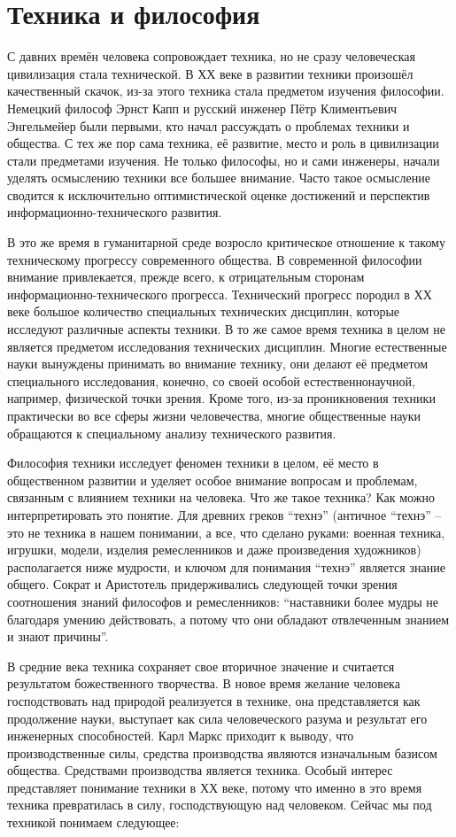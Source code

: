 \section{Техника и философия}
С давних времён человека сопровождает техника, но не сразу человеческая цивилизация стала технической. В ХХ веке в развитии техники произошёл качественный скачок, из-за этого техника стала предметом изучения философии. Немецкий философ Эрнст Капп и русский инженер Пётр Климентьевич Энгельмейер были первыми, кто начал рассуждать о проблемах техники и общества. С тех же пор сама техника, её развитие, место и роль в цивилизации стали предметами изучения. Не только философы, но и сами инженеры, начали уделять осмыслению техники все большее внимание. Часто такое осмысление сводится к исключительно оптимистической оценке достижений и перспектив информационно-технического развития. 

В это же время в гуманитарной среде возросло критическое отношение к такому техническому прогрессу современного общества. В современной философии внимание привлекается, прежде всего, к отрицательным сторонам информационно-технического прогресса.  Технический прогресс породил в ХХ веке большое количество специальных технических дисциплин, которые исследуют различные аспекты техники. В то же самое время техника в целом не является предметом исследования технических дисциплин. Многие естественные науки вынуждены принимать во внимание технику, они делают её предметом специального исследования, конечно, со своей особой естественнонаучной, например, физической точки зрения. Кроме того, из-за проникновения техники практически во все сферы жизни человечества, многие общественные науки обращаются к специальному анализу технического развития. 

Философия техники исследует феномен техники в целом, её место в общественном развитии и уделяет особое внимание вопросам и проблемам, связанным с влиянием техники на человека.  Что же такое техника? Как можно интерпретировать это понятие. Для древних греков ``технэ'' (античное ``технэ'' – это не техника в нашем понимании, а все, что сделано руками: военная техника, игрушки, модели, изделия ремесленников и даже произведения художников) располагается ниже мудрости, и ключом для понимания ``технэ'' является знание общего. Сократ и Аристотель придерживались следующей точки зрения соотношения знаний философов и ремесленников: ``наставники более мудры не благодаря умению действовать, а потому что они обладают отвлеченным знанием и знают причины''.

В средние века техника сохраняет свое вторичное значение и считается результатом божественного творчества. В новое время желание человека господствовать над природой реализуется в технике, она представляется как продолжение науки, выступает как сила человеческого разума и результат его инженерных способностей. Карл Маркс приходит к выводу, что производственные силы, средства производства являются изначальным базисом общества. Средствами производства является техника. Особый интерес представляет понимание техники в ХХ веке, потому что именно в это время техника превратилась в силу, господствующую над человеком. Сейчас мы под техникой понимаем следующее:

